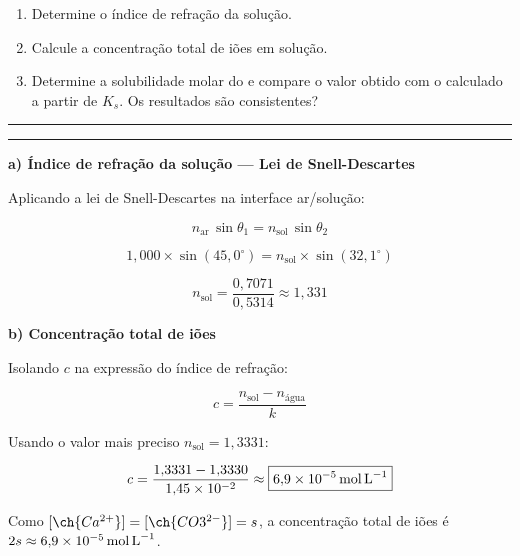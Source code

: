 \documentclass[12pt,a4paper]{article}
\begin{document}
\medskip

\begin{enumerate}[label=\textbf{\alph*)}, leftmargin=1.8em, itemsep=6pt]
  \item Determine o índice de refração da solução.
  \item Calcule a concentração total de iões em solução.
  \item Determine a solubilidade molar do  e compare o valor obtido
        com o calculado a partir de $K_s$. Os resultados são consistentes?
\end{enumerate}

\bigskip\bigskip

\noindent\textcolor{verde}{\rule{\linewidth}{0.5pt}}

\medskip
{}
\medskip

\noindent\textcolor{verde}{\rule{\linewidth}{0.5pt}}

\bigskip

\begin{mdframed}[style=resolucao]
\textbf{a) Índice de refração da solução --- Lei de Snell-Descartes}

\medskip

Aplicando a lei de Snell-Descartes na interface ar/solução:

\[
  n_{\text{ar}}\,\sin\theta_1 = n_{\text{sol}}\,\sin\theta_2
\]

\[
  1{,}000 \times \sin(45{,}0^\circ) = n_{\text{sol}} \times \sin(32{,}1^\circ)
\]

\[
  n_{\text{sol}} = \frac{0{,}7071}{0{,}5314} \approx \boxed{1{,}331}
\]
\end{mdframed}

\bigskip

\begin{mdframed}[style=resolucao]
\textbf{b) Concentração total de iões}

\medskip

Isolando \(c\) na expressão do índice de refração:

\[
  c = \frac{n_{\text{sol}} - n_{\text{água}}}{k}
\]

Usando o valor mais preciso \(n_{\text{sol}} = 1{,}3331\):

\[
  c = \frac{1{,}3331 - 1{,}3330}{1{,}45 \times 10^{-2}}
    \approx \boxed{6{,}9 \times 10^{-5}\,\text{mol\,L}^{-1}}
\]

\medskip
Como \([\ch{Ca^{2+}}] = [\ch{CO3^{2-}}] = s\), a concentração total de iões
é \(2s \approx 6{,}9 \times 10^{-5}\,\text{mol\,L}^{-1}\).
\end{mdframed}
\end{document}

